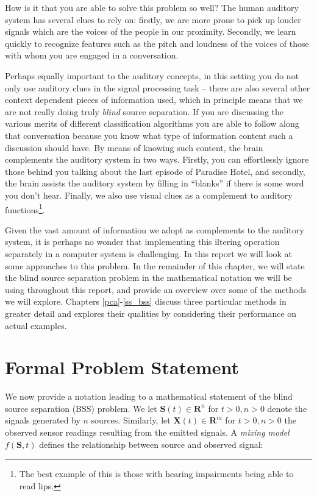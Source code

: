 \documentclass[11pt, oneside, a4paper]{report}
\begin{document}
How is it that you are able to solve this problem so well? The human
auditory system has several clues to rely on: firstly, we are more
prone to pick up louder signals which are the voices of the people in
our proximity. Secondly, we learn quickly to recognize features such
as the pitch and loudness of the voices of those with whom you
are engaged in a conversation.

Perhaps equally important to the auditory concepts, in this setting you do not only use auditory clues in the
signal processing task -- there are also several other context
dependent pieces of information used, which in principle means that we
are not really doing truly \emph{blind} source separation. If you are discussing the various merits of
different classification algorithms you are able to follow along that
conversation because you know what type of information content such a
discussion should have. By  means of knowing such content, the brain
complements the auditory system in two ways. Firstly, you
can effortlessly ignore those behind you talking about the last
episode of Paradise Hotel, and secondly, the brain assists the
auditory system by filling in ``blanks'' if there is some word you
don't hear. Finally, we also use visual clues as a complement to
auditory functions\footnote{The best example of this is those with
  hearing impairments being able to read lips.}. 

Given the vast amount of information we adopt as complements to the auditory system, it is perhaps no wonder that implementing this
iltering operation separately in a computer system is challenging. In
this report we will look at some approaches to this problem. In the
remainder of this chapter, we will state the blind source separation
problem in the mathematical notation we will be using throughout this
report, and provide an overview over some of the methods we will
explore. Chapters \ref{pca}-\ref{ss_bss} discuss three particular
methods in greater detail and explores their qualities by considering
their performance on actual examples.


\section{Formal Problem Statement}

We now provide a notation leading to a mathematical statement of the
blind source separation (BSS) problem. We let $\boldsymbol{S}(t)\in
\mathbf{R}^n$ for $t>0, n>0$ denote the signals generated by $n$
sources. Similarly, let $\boldsymbol{X}(t)\in \mathbf{R}^m$ for $t>0,
n>0$ the observed sensor readings resulting from the emitted
signals. A \emph{mixing model} $f(\boldsymbol{S},t)$ defines the
relationship between source and observed signal:
\end{document}
